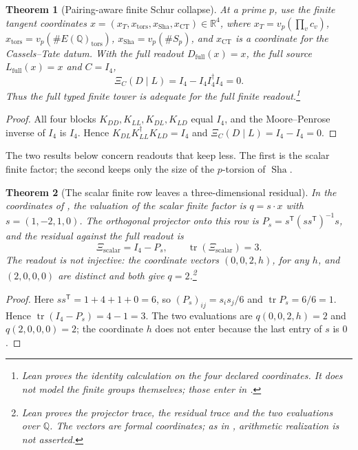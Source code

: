 \documentclass[11pt]{article}
\newtheorem{theorem}{Theorem}[section]
\theoremstyle{definition}
\newcommand{\Q}{\mathbb{Q}}
\newcommand{\R}{\mathbb{R}}
\newcommand{\Sha}{\operatorname{Sha}}
\newcommand{\tors}{\operatorname{tors}}
\newcommand{\tr}{\operatorname{tr}}
\newcommand{\XiC}{\Xi_C(D\mid L)}        \newcommand{\KDD}{K_{DD}}
\newcommand{\KDL}{K_{DL}}
\newcommand{\KLL}{K_{LL}}
\newcommand{\Kdagger}{K_{LL}^{\dagger}}  \newcommand{\vsrc}{\mathrm{vsrc}}        \newcommand{\Jone}{J_1}
\begin{document}
\begin{theorem}[Pairing-aware finite Schur collapse]\label{thm:apparatus:finite-source-schur-collapse}
At a prime $p$, use the finite tangent coordinates
$x=(x_T,x_{\tors},x_{\Sha},x_{\mathrm{CT}})\in\R^4$, where
$x_T=v_p(\prod_vc_v)$, $x_{\tors}=v_p(\#E(\Q)_{\tors})$,
$x_{\Sha}=v_p(\#S_p)$, and $x_{\mathrm{CT}}$ is a coordinate for the
Cassels--Tate datum.  With the full readout $D_{\mathrm{full}}(x)=x$, the
full source $L_{\mathrm{full}}(x)=x$ and $C=I_4$,
\[
  \XiC=I_4-I_4I_4^{\dagger}I_4=0.
\]
Thus the full typed finite tower is adequate for the full finite
readout.\footnote{Lean proves the identity calculation on the four declared
coordinates.  It does not model the finite groups themselves; those
enter in .}
\end{theorem}

\begin{proof}
All four blocks $\KDD,\KLL,\KDL,K_{LD}$ equal $I_4$, and the
Moore--Penrose inverse of $I_4$ is $I_4$.  Hence
$\KDL\Kdagger K_{LD}=I_4$ and $\XiC=I_4-I_4=0$.
\end{proof}

The two results below concern readouts that keep less.  The first is the
scalar finite factor; the second keeps only the size of the $p$-torsion
of $\Sha$.

\begin{theorem}[The scalar finite row leaves a three-dimensional residual]\label{thm:apparatus:scalar-finite-shadow}
In the coordinates of ,
the valuation of the scalar finite factor is $q=s\cdot x$ with
$s=(1,-2,1,0)$.  The orthogonal projector onto this row is
$P_s=s^{\mathsf T}(ss^{\mathsf T})^{-1}s$, and the residual against the
full readout is
\[
  \Xi_{\mathrm{scalar}}=I_4-P_s,
  \qquad
  \tr(\Xi_{\mathrm{scalar}})=3.
\]
The readout is not injective: the coordinate vectors $(0,0,2,h)$, for
any $h$, and $(2,0,0,0)$ are distinct and both give $q=2$.\footnote{Lean proves the projector trace, the residual trace and the
two evaluations over $\Q$.  The vectors are formal coordinates; as in
, arithmetic realization
is not asserted.}
\end{theorem}

\begin{proof}
Here $ss^{\mathsf T}=1+4+1+0=6$, so $(P_s)_{ij}=s_is_j/6$ and
$\tr P_s=6/6=1$.  Hence $\tr(I_4-P_s)=4-1=3$.  The two evaluations are
$q(0,0,2,h)=2$ and $q(2,0,0,0)=2$; the coordinate $h$ does not enter
because the last entry of $s$ is $0$.
\end{proof}
\end{document}
